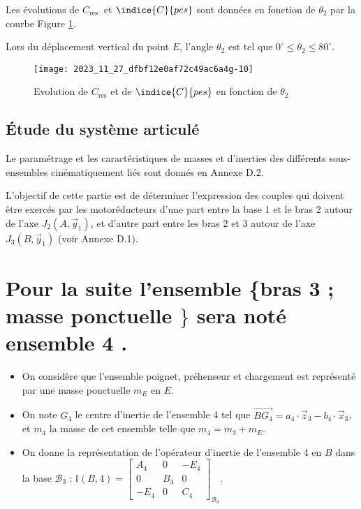 Les évolutions de $C_{\text {res }}$ et $\indice{C}{pes}$ sont données en fonction de $\theta_{2}$ par la courbe Figure \ref{fig:09}.

\begin{rem}
Lors du déplacement vertical du point $E$, l'angle $\theta_{2}$ est tel que $0^{\circ} \leq \theta_{2} \leq 80^{\circ}$.
\end{rem}

\begin{figure}[!h]
\centering
\texttt{[image: 2023\_11\_27\_dfbf12e0af72c49ac6a4g-10]}
\caption{Evolution de $C_{\text{res}}$ et de $\indice{C}{pes}$ en fonction de $\theta_{2}$ \label{fig:09}}
\end{figure}



\subsection{Étude du système articulé}
Le paramétrage et les caractéristiques de masses et d'inerties des différents sous-ensembles cinématiquement liés sont donnés en Annexe D.2.

L'objectif de cette partie est de déterminer l'expression des couples qui doivent être exercés par les motoréducteurs d'une part entre la base 1 et le bras 2 autour de l'axe $J_{2}\left(A, \vec{y}_{1}\right)$, et d'autre part entre les bras 2 et 3 autour de l'axe $J_{3}\left(B, \vec{y}_{1}\right)$ (voir Annexe D.1).

\section*{Pour la suite l'ensemble \{bras 3 ; masse ponctuelle $\}$ sera noté ensemble 4 .}
\begin{itemize}
  \item On considère que l'ensemble poignet, préhenseur et chargement est représenté par une masse ponctuelle $m_{E}$ en $E$.

  \item On note $G_{4}$ le centre d'inertie de l'ensemble 4 tel que $\overrightarrow{B G_{4}}=a_{4} \cdot \vec{z}_{3}-b_{4} \cdot \vec{x}_{3}$, et $m_{4}$ la masse de cet ensemble telle que $m_{4}=m_{3}+m_{E}$.

  \item On donne la représentation de l'opérateur d'inertie de l'ensemble 4 en $B$ dans la base $\mathcal{B}_{3}$ :
$
\mathbb{I}(B, 4)=\left[\begin{array}{ccc}
A_{4} & 0 & -E_{4} \\
0 & B_{4} & 0 \\
-E_{4} & 0 & C_{4}
\end{array}\right]_{\mathcal{B}_{3}}
$.
\end{itemize}

